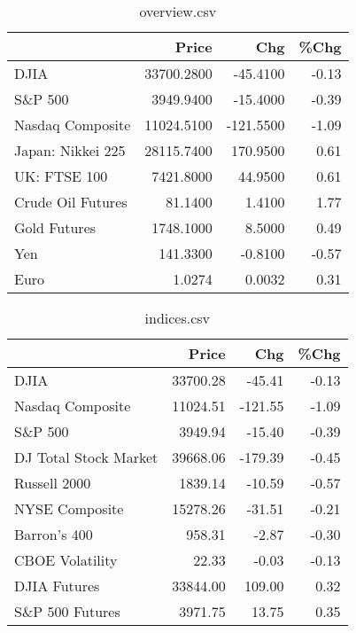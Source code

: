 \documentclass{article}%
\begin{document}
\begin{table}[htbp]%
\caption{overview.csv}%
\centering%
\begin{adjustbox}{width=1\textwidth}%
\begin{tabular}{lrrr}
\toprule
                  &      Price &       Chg &  \%Chg \\
\midrule
             DJIA & 33700.2800 &  -45.4100 & -0.13 \\
          S\&P 500 &  3949.9400 &  -15.4000 & -0.39 \\
 Nasdaq Composite & 11024.5100 & -121.5500 & -1.09 \\
Japan: Nikkei 225 & 28115.7400 &  170.9500 &  0.61 \\
     UK: FTSE 100 &  7421.8000 &   44.9500 &  0.61 \\
Crude Oil Futures &    81.1400 &    1.4100 &  1.77 \\
     Gold Futures &  1748.1000 &    8.5000 &  0.49 \\
              Yen &   141.3300 &   -0.8100 & -0.57 \\
             Euro &     1.0274 &    0.0032 &  0.31 \\
\bottomrule
\end{tabular}
%
\end{adjustbox}%
\end{table}

%


\begin{table}[htbp]%
\caption{indices.csv}%
\centering%
\begin{adjustbox}{width=1\textwidth}%
\begin{tabular}{lrrr}
\toprule
                      &    Price &     Chg &  \%Chg \\
\midrule
                 DJIA & 33700.28 &  -45.41 & -0.13 \\
     Nasdaq Composite & 11024.51 & -121.55 & -1.09 \\
              S\&P 500 &  3949.94 &  -15.40 & -0.39 \\
DJ Total Stock Market & 39668.06 & -179.39 & -0.45 \\
         Russell 2000 &  1839.14 &  -10.59 & -0.57 \\
       NYSE Composite & 15278.26 &  -31.51 & -0.21 \\
         Barron's 400 &   958.31 &   -2.87 & -0.30 \\
      CBOE Volatility &    22.33 &   -0.03 & -0.13 \\
         DJIA Futures & 33844.00 &  109.00 &  0.32 \\
      S\&P 500 Futures &  3971.75 &   13.75 &  0.35 \\
\bottomrule
\end{tabular}
%
\end{adjustbox}%
\end{table}
\end{document}
